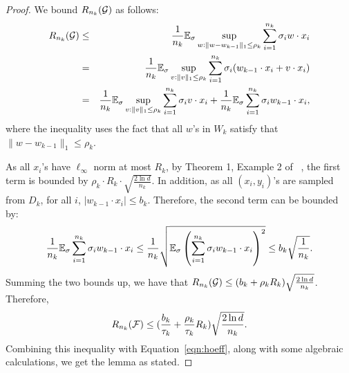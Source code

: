\begin{proof}
We bound $R_{n_k}(\mathcal{G})$ as follows:
\begin{eqnarray*}
R_{n_k}(\mathcal{G}) &\leq& \frac 1 {n_k} \mathbb{E}_\sigma \sup_{w: \| w - w_{k-1} \|_1 \leq \rho_k} \sum_{i=1}^{n_k} \sigma_i w \cdot x_i \\
&=& \frac 1 {n_k} \mathbb{E}_\sigma \sup_{v: \| v \|_1 \leq \rho_k} \sum_{i=1}^{n_k} \sigma_i (w_{k-1} \cdot x_i + v \cdot x_i) \\
&=& \frac 1 {n_k} \mathbb{E}_\sigma \sup_{v: \| v \|_1 \leq \rho_k} \sum_{i=1}^{n_k} \sigma_i v \cdot x_i + \frac 1 {n_k} \mathbb{E}_\sigma \sum_{i=1}^{n_k} \sigma_i w_{k-1} \cdot x_i, \\
\end{eqnarray*}
where the inequality uses the fact that all $w$'s in $W_k$ satisfy that $\| w - w_{k-1} \|_1 \leq \rho_k$.

As all $x_i$'s have $\ell_\infty$ norm at most $R_k$, by Theorem 1, Example 2 of ~\cite{KST09}, the first term is bounded by
$\rho_k \cdot R_k \cdot \sqrt{\frac{2 \ln d}{n_k}}$. In addition, as all $(x_i, y_i)$'s are sampled from $D_k$, for all $i$, $|w_{k-1} \cdot x_i| \leq b_k$. Therefore, the second term can be bounded by:
\[ \frac 1 {n_k} \mathbb{E}_\sigma \sum_{i=1}^{n_k} \sigma_i w_{k-1} \cdot x_i \leq \frac 1 {n_k} \sqrt{\mathbb{E}_\sigma \left(\sum_{i=1}^{n_k} \sigma_i w_{k-1} \cdot x_i \right)^2} \leq b_k \sqrt{\frac 1 {n_k}}. \]
Summing the two bounds up, we have that $R_{n_k}(\mathcal{G}) \leq (b_k + \rho_{k} R_k)\sqrt{\frac{2 \ln d}{n_k}}$. Therefore,
\[ R_{n_k}(\mathcal{F}) \leq (\frac{b_k}{\tau_k} + \frac{\rho_{k}}{\tau_k} R_k)\sqrt{\frac{2 \ln d}{n_k}}. \]
Combining this inequality with Equation~\eqref{eqn:hoeff}, along with some algebraic calculations, we get the lemma as stated.
\end{proof}



